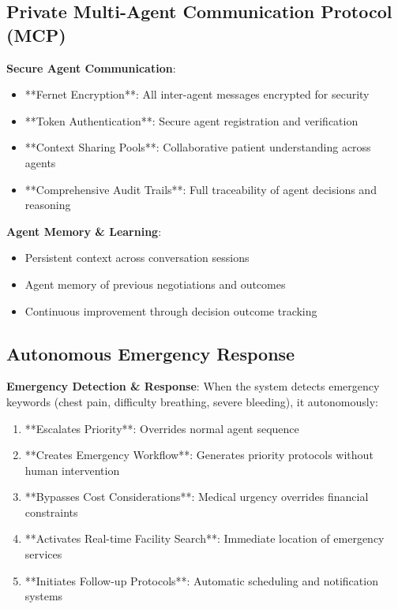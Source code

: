 \documentclass[11pt,a4paper]{article}
\begin{document}
\subsection{Private Multi-Agent Communication Protocol (MCP)}

\textbf{Secure Agent Communication}:
\begin{itemize}[leftmargin=*, itemsep=0pt]
    \item **Fernet Encryption**: All inter-agent messages encrypted for security
    \item **Token Authentication**: Secure agent registration and verification
    \item **Context Sharing Pools**: Collaborative patient understanding across agents
    \item **Comprehensive Audit Trails**: Full traceability of agent decisions and reasoning
\end{itemize}

\textbf{Agent Memory \& Learning}:
\begin{itemize}[leftmargin=*, itemsep=0pt]
    \item Persistent context across conversation sessions
    \item Agent memory of previous negotiations and outcomes
    \item Continuous improvement through decision outcome tracking
\end{itemize}

\subsection{Autonomous Emergency Response}

\textbf{Emergency Detection \& Response}:
When the system detects emergency keywords (chest pain, difficulty breathing, severe bleeding), it autonomously:
\begin{enumerate}[itemsep=0pt]
    \item **Escalates Priority**: Overrides normal agent sequence
    \item **Creates Emergency Workflow**: Generates priority protocols without human intervention
    \item **Bypasses Cost Considerations**: Medical urgency overrides financial constraints
    \item **Activates Real-time Facility Search**: Immediate location of emergency services
    \item **Initiates Follow-up Protocols**: Automatic scheduling and notification systems
\end{enumerate}
\end{document}
